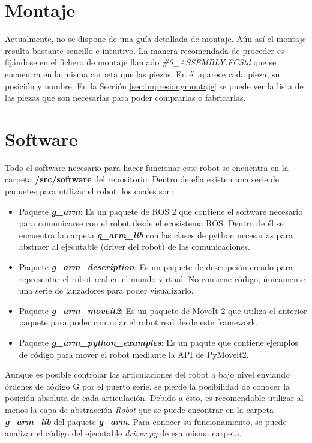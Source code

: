 \newpage
\section*{Montaje}
\noindent Actualmente, no se dispone de una guía detallada de montaje. Aún así el montaje resulta bastante sencillo 
e intuitivo. La manera recomendada de proceder es fijándose en el fichero de 
montaje llamado \textit{\#0\_ASSEMBLY.FCStd} que se encuentra en la misma carpeta que las piezas. En él 
aparece cada pieza, su posición y nombre. En la Sección \ref{sec:impresionymontaje} se puede ver la lista de las piezas que 
son necesarias para poder comprarlas o fabricarlas.

\section*{Software}
\noindent Todo el software necesario para hacer funcionar este robot se encuentra en la carpeta \textbf{/src/software} del repositorio. Dentro de 
ella existen una serie de paquetes para utilizar el robot, los cuales son:
\begin{itemize}
\item Paquete \textbf{\textit{g\_arm}}: Es un paquete de ROS 2 que contiene el software necesario para comunicarse con el robot desde el 
ecosistema ROS. Dentro de él se encuentra la carpeta \textbf{\textit{g\_arm\_lib}} con las clases de python necesarias para abstraer al 
ejecutable (driver del robot) de las comunicaciones.
\item Paquete \textbf{\textit{g\_arm\_description}}: Es un paquete de descripción creado para representar el robot real en el mundo virtual. No contiene código, únicamente una serie de lanzadores para poder visualizarlo.
\item Paquete \textbf{\textit{g\_arm\_moveit2}}: Es un paquete de MoveIt 2 que utiliza el anterior paquete para poder controlar el robot 
real desde este framework.
\item Paquete \textbf{\textit{g\_arm\_python\_examples}}: Es un paqute que contiene ejemplos de código para mover el robot mediante la API de PyMoveit2.
\end{itemize}

\begin{tcolorbox}[colback=blue!5!white,colframe=blue!75!black,title=Nota]
    Aunque es posible controlar las articulaciones del robot a bajo nivel enviando órdenes de código G por el puerto serie, se pierde la 
posibilidad de conocer la posición absoluta 
de cada articulación. Debido a esto, es recomendable utilizar al menos la capa de abstracción \textit{Robot} que se puede encontrar en 
la carpeta \textbf{\textit{g\_arm\_lib}} del paquete \textbf{\textit{g\_arm}}. Para conocer su funcionamiento, se puede analizar el código del ejecutable 
\textit{driver.py} de esa misma carpeta. 
\end{tcolorbox}

